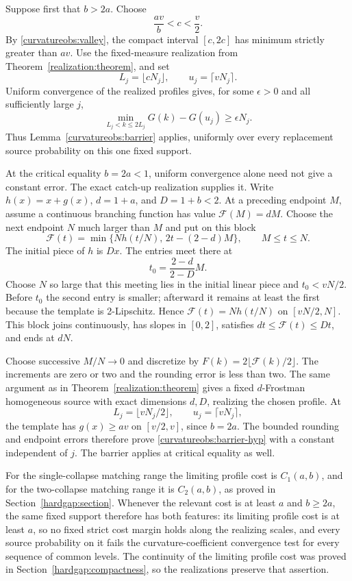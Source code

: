 Suppose first that \(b>2a\). Choose
\[
 \frac{av}{b}<c<\frac v2.
\]
By \eqref{curvatureobs:valley}, the compact interval \([c,2c]\)
has minimum strictly greater than \(av\).
Use the fixed-measure realization from
Theorem~\ref{realization:theorem}, and set
\[
 L_j=\lfloor cN_j\rfloor,\qquad u_j=\lceil vN_j\rceil.
\]
Uniform convergence of the realized profiles gives, for some
\(\epsilon>0\) and all sufficiently large \(j\),
\[
 \min_{L_j<k\le2L_j}G(k)-G(u_j)\ge\epsilon N_j.
\]
Thus Lemma~\ref{curvatureobs:barrier} applies, uniformly over every
replacement source probability on this one fixed support.

At the critical equality \(b=2a<1\), uniform convergence alone need
not give a constant error. The exact catch-up realization supplies it.
Write \(h(x)=x+g(x)\), \(d=1+a\), and \(D=1+b<2\).
At a preceding endpoint \(M\), assume a continuous branching function
has value \(\mathcal F(M)=dM\). Choose the next endpoint \(N\) much
larger than \(M\) and put on this block
\begin{equation}\label{curvatureobs:catchup}
 \mathcal F(t)=
 \min\{Nh(t/N),\,2t-(2-d)M\},\qquad M\le t\le N.
\end{equation}
The initial piece of \(h\) is \(Dx\). The entries meet there at
\[
 t_0=\frac{2-d}{2-D}M.
\]
Choose \(N\) so large that this meeting lies in the initial linear
piece and \(t_0<vN/2\). Before \(t_0\) the second entry is smaller;
afterward it remains at least the first because the template is
2-Lipschitz. Hence \(\mathcal F(t)=Nh(t/N)\) on
\([vN/2,N]\). This block joins continuously, has slopes in \([0,2]\),
satisfies \(dt\le\mathcal F(t)\le Dt\), and ends at \(dN\).

Choose successive \(M/N\to0\) and discretize by
\(F(k)=2\lfloor\mathcal F(k)/2\rfloor\). The increments are zero
or two and the rounding error is less than two. The same argument as
in Theorem~\ref{realization:theorem} gives a fixed \(d\)-Frostman
homogeneous source with exact dimensions \(d,D\), realizing the chosen
profile. At
\[
 L_j=\lfloor vN_j/2\rfloor,\qquad u_j=\lceil vN_j\rceil,
\]
the template has \(g(x)\ge av\) on \([v/2,v]\), since \(b=2a\).
The bounded rounding and endpoint errors therefore prove
\eqref{curvatureobs:barrier-hyp} with a constant independent of \(j\).
The barrier applies at critical equality as well.

For the single-collapse matching range the limiting profile cost is
\(C_1(a,b)\), and for the two-collapse matching range it is \(C_2(a,b)\),
as proved in Section~\ref{hardgap:section}. Whenever the relevant cost
is at least \(a\) and \(b\ge2a\), the same fixed support therefore has
both features: its limiting profile cost is at least \(a\), so no
fixed strict cost margin holds along the realizing scales, and
every source probability on it fails the curvature-coefficient
convergence test for every sequence of common levels. The continuity
of the limiting profile cost was proved in
Section~\ref{hardgap:compactness}, so the realizations preserve that
assertion.

